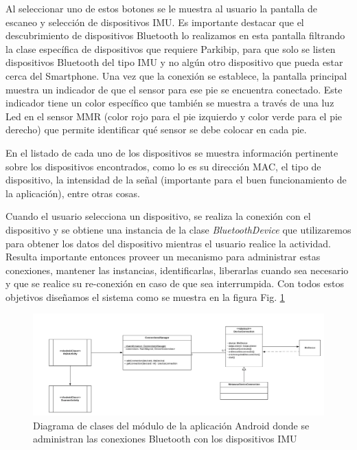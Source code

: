 Al seleccionar uno de estos botones se le muestra al usuario la pantalla de escaneo y selección de dispositivos IMU. Es importante destacar que el descubrimiento de dispositivos Bluetooth lo realizamos en esta pantalla filtrando la clase específica de dispositivos que requiere Parkibip, para que solo se listen dispositivos Bluetooth del tipo IMU y no algún otro dispositivo que pueda estar cerca del Smartphone. Una vez que la conexión se establece, la pantalla principal muestra un indicador de que el sensor para ese pie se encuentra conectado. Este indicador tiene un color específico que también se muestra a través de una luz Led en el sensor MMR (color rojo para el pie izquierdo y color verde para el pie derecho) que permite identificar qué sensor se debe colocar en cada pie. 

En el listado de cada uno de los dispositivos se muestra información pertinente sobre los dispositivos encontrados, como lo es su dirección MAC, el tipo de dispositivo, la intensidad de la señal (importante para el buen funcionamiento de la aplicación), entre otras cosas. 

Cuando el usuario selecciona un dispositivo, se realiza la conexión con el dispositivo y se obtiene una instancia de la clase \textit{BluetoothDevice} que utilizaremos para obtener los datos del dispositivo mientras el usuario realice la actividad. Resulta importante entonces proveer un mecanismo para administrar estas conexiones, mantener las instancias, identificarlas, liberarlas cuando sea necesario y que se realice su re-conexión en caso de que sea interrumpida. Con todos estos objetivos diseñamos el sistema como se muestra en la figura Fig. \ref{FIG:connections-management} 

\begin{figure}[H]
    \hspace*{-3.5cm}%
    \includegraphics[clip,width=1.4 \columnwidth]{TESIS/imagenes/chap05/connections-management-design.png}
    \caption{Diagrama de clases del módulo de la aplicación Android donde se administran las conexiones Bluetooth con los dispositivos IMU}
    \label{FIG:connections-management}
\end{figure}

